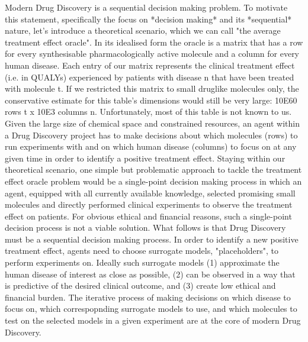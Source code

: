 Modern Drug Discovery is a sequential decision making problem. To motivate this statement, specifically the focus on *decision making* and its *sequential* nature, let's introduce a theoretical scenario, which we can call "the average treatment effect oracle". In its idealised form the oracle is a matrix that has a row for every synthesisable pharmacologically active molecule and a column for every human disease. Each entry of our matrix represents the clinical treatment effect (i.e. in QUALYs) experienced by patients with disease n that have been treated with molecule t. If we restricted this matrix to small druglike molecules only, the conservative estimate for this table's dimensions would still be very large: 10E60 rows t x 10E3 columns n. Unfortunately, most of this table is not known to us. Given the large size of chemical space and constrained resources, an agent within a Drug Discovery project has to make decisions about which molecules (rows) to run experiments with and on which human disease (columns) to focus on at any given time in order to identify a positive treatment effect. Staying within our theoretical scenario, one simple but problematic approach to tackle the treatment effect oracle problem would be a single-point decision making process in which an agent, equipped with all currently available knowledge, selected promising small molecules and directly performed clinical experiments to observe the treatment effect on patients. For obvious ethical and financial reasons, such a single-point decision process is not a viable solution. What follows is that Drug Discovery must be a sequential decision making process. In order to identify a new positive treatment effect, agents need to choose surrogate models, "placeholders", to perform experiments on. Ideally such surrogate models (1) approximate the human disease of interest as close as possible, (2) can be observed in a way that is predictive of the desired clinical outcome, and (3) create low ethical and financial burden. The iterative process of making decisions on which disease to focus on, which correspopnding surrogate models to use, and which molecules to test on the selected models in a given experiment are at the core of modern Drug Discovery. \par